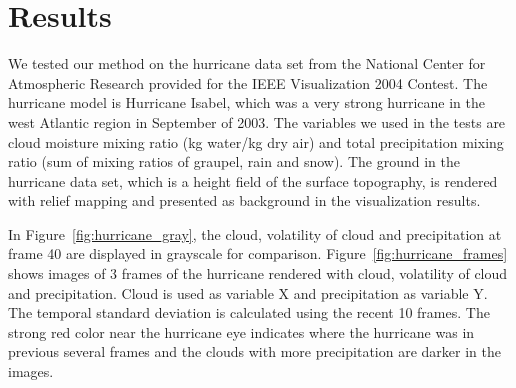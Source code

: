 

\section{Results}
We tested our method on the hurricane data set from the National Center for Atmospheric Research provided for the IEEE Visualization 2004 Contest.
The hurricane model is Hurricane Isabel, which was a very strong hurricane in the west Atlantic region in September of 2003.
The variables we used in the tests are cloud moisture mixing ratio (kg water/kg dry air) and total precipitation mixing ratio (sum of mixing ratios of graupel, rain and snow). The ground in the hurricane data set, which is a height field of the surface topography, is rendered with relief mapping and presented as background in the visualization results.

In Figure~\ref{fig:hurricane_gray}, the cloud, volatility of cloud and precipitation at frame 40 are displayed in grayscale for comparison.
Figure~\ref{fig:hurricane_frames} shows images of 3 frames of the hurricane rendered with cloud, volatility of cloud and precipitation. Cloud is used as variable X and precipitation as variable Y. The temporal standard deviation is calculated using the recent 10 frames.
The strong red color near the hurricane eye indicates where the hurricane was in previous several frames and the clouds with more precipitation are darker in the images.

